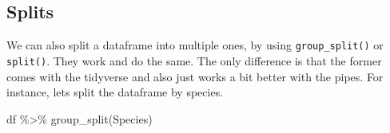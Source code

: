 \documentclass[
]{book}
\newenvironment{Shaded}{\begin{snugshade}}{\end{snugshade}}
\newcommand{\FunctionTok}[1]{\textcolor[rgb]{0.00,0.00,0.00}{#1}}
\newcommand{\NormalTok}[1]{#1}
\newcommand{\SpecialCharTok}[1]{\textcolor[rgb]{0.00,0.00,0.00}{#1}}
\begin{document}
\hypertarget{splits}{%
\subsection{Splits}\label{splits}}

We can also split a dataframe into multiple ones, by using \texttt{group\_split()} or \texttt{split()}.
They work and do the same.
The only difference is that the former comes with the tidyverse and also just works a bit better with the pipes.
For instance, lets split the dataframe by species.

\begin{Shaded}
\begin{Highlighting}[]
\NormalTok{df }\SpecialCharTok{\%\textgreater{}\%} 
  \FunctionTok{group\_split}\NormalTok{(Species) }
\end{Highlighting}
\end{Shaded}
\end{document}
